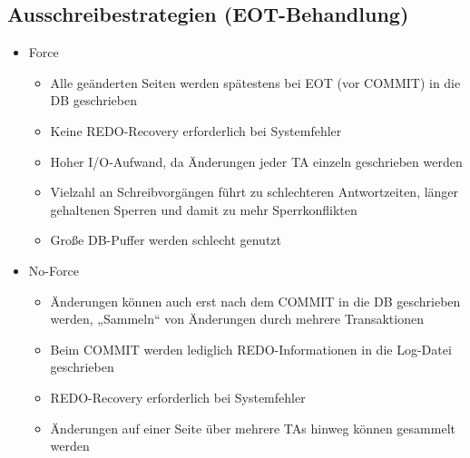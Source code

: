 \documentclass{lehramt-informatik-haupt}
\begin{document}
%

\subsection{Ausschreibestrategien (EOT-Behandlung)}

\begin{itemize}

\item Force

\begin{itemize}
\item Alle geänderten Seiten werden spätestens bei EOT (vor COMMIT) in
die DB geschrieben

\item Keine REDO-Recovery erforderlich bei Systemfehler

\item Hoher I/O-Aufwand, da Änderungen jeder TA einzeln geschrieben
werden

\item Vielzahl an Schreibvorgängen führt zu schlechteren Antwortzeiten,
länger gehaltenen Sperren und damit zu mehr Sperrkonflikten

\item Große DB-Puffer werden schlecht genutzt
\end{itemize}

\item No-Force

\begin{itemize}
\item Änderungen können auch erst nach dem COMMIT in die DB geschrieben
werden, „Sammeln“ von Änderungen durch mehrere Transaktionen

\item Beim COMMIT werden lediglich REDO-Informationen in die Log-Datei
geschrieben

\item REDO-Recovery erforderlich bei Systemfehler

\item Änderungen auf einer Seite über mehrere TAs hinweg können
gesammelt werden
\end{itemize}
\end{itemize}

\literatur
\end{document}
